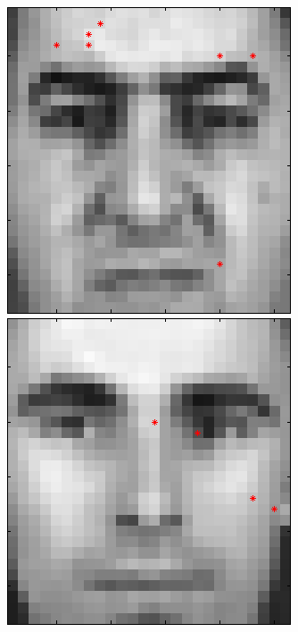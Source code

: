 \begin{figure}[ht]
 \includegraphics[width=\textwidth*11/100]{ch5/figures/XM2VTS_4_0.png}
 \includegraphics[width=\textwidth*11/100]{ch5/figures/XM2VTS_5_0.png}

\end{figure}
